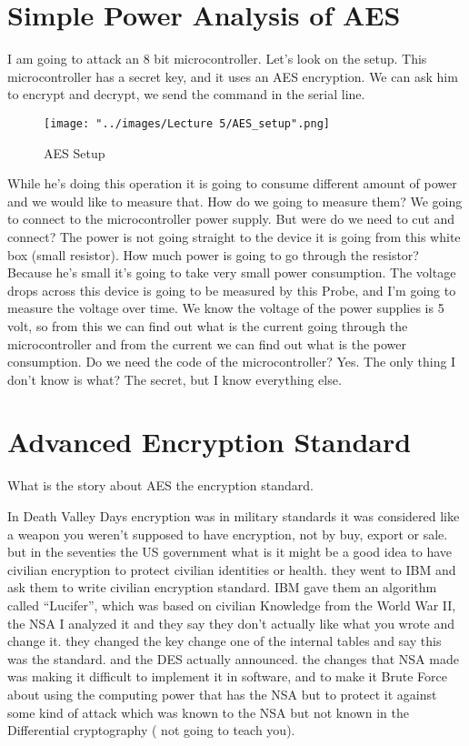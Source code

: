 \documentclass{report}
\begin{document}
\section{Simple Power Analysis of AES}

I am going to attack an 8 bit microcontroller. Let's look on the setup. This microcontroller has a secret key, and it uses an AES encryption. We can ask him to encrypt and decrypt, we send the command in the serial line.

\begin{figure}
\hspace*{0.5in}
\texttt{[image: "../images/Lecture 5/AES\_setup".png]}
\caption{AES Setup}
\label{}
\end{figure}
 
While he's doing this operation it is going to consume different amount of power and we would like to measure that. How do we going to measure them? We going to connect to the microcontroller power supply. But were do we need to cut and connect? The power is not going straight to the device it is going from this white box (small resistor). How much power is going to go through the resistor? Because he's small it's going to take very small power consumption. The voltage drops across this device is going to be measured by this Probe, and I'm going to measure the voltage over time. We know the voltage of the power supplies is 5 volt, so from this we can find out what is the current going through the microcontroller and from the current we can find out what is the power consumption. Do we need the code of the microcontroller? Yes. The only thing I don't know is what? The secret, but I know everything else.
 
\section{Advanced Encryption Standard} 
 
What is the story about AES the encryption standard. 

In Death Valley Days encryption was in military standards it was considered like a weapon you weren't supposed to have encryption, not by buy, export or sale. but in the seventies the US government what is it might be a good idea to have civilian encryption to protect civilian identities or health. they went to IBM and ask them to write civilian encryption standard. IBM gave them an algorithm called “Lucifer”, which was based on civilian Knowledge from the World War II, the NSA I analyzed it and they say they don't actually like what you wrote and change it. they changed the key change one of the internal tables and say this was the standard. and the DES actually announced. the changes that NSA made was making it difficult to implement it in software, and to make it Brute Force about using the computing power that has the NSA but to protect it against some kind of attack which was known to the NSA but not known in the Differential cryptography ( not going to teach you).
\end{document}
